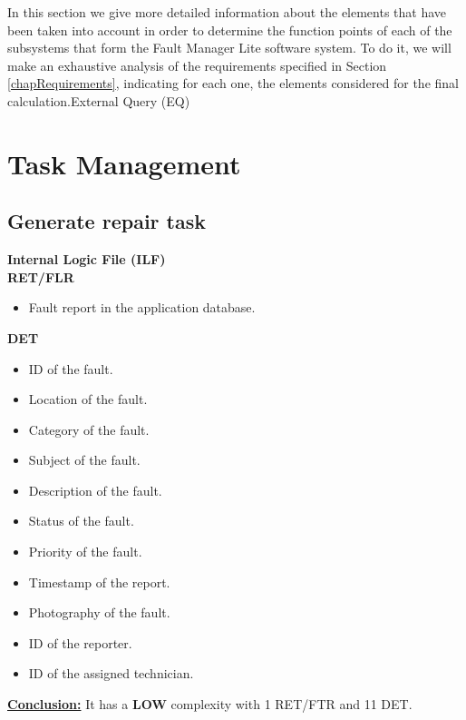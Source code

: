 
In this section we give more detailed information about the elements that have been taken into account in order to determine the function points of each of the subsystems that form the Fault Manager Lite software system. To do it, we will make an exhaustive analysis of the requirements specified in Section \ref{chapRequirements}, indicating for each one, the elements considered for the final calculation.External Query (EQ) 


\section{Task Management}

\subsection{Generate repair task}
\textbf{Internal Logic File (ILF)} \\ 
\textbf{RET/FLR}
\begin{itemize}
\item Fault report in the application database.
\end{itemize}
\textbf{DET}
\begin{itemize}
\item ID of the fault.
\item Location of the fault.
\item Category of the fault.
\item Subject of the fault.
\item Description of the fault.
\item Status of the fault.
\item Priority of the fault.
\item Timestamp of the report.
\item Photography of the fault.
\item ID of the reporter.
\item ID of the assigned technician.
\end{itemize}
\textbf{\underline{Conclusion:}} It has a \textbf{LOW} complexity with 1 RET/FTR and 11 DET.

